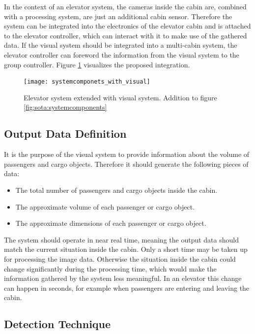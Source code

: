 In the context of an elevator system, 
the cameras inside the cabin are, 
combined with a processing system, 
are just an additional cabin sensor.
Therefore the system can be integrated into the electronics of the elevator cabin
and is attached to the elevator controller, 
which can interact with it to make use of the gathered data.
If the visual system should be integrated into a multi-cabin system, 
the elevator controller can foreword the information from the visual system to the group controller.
Figure \ref{fig:design:systemintegration} visualizes the proposed integration.

\begin{figure}[htb]
    \centering
    \texttt{[image: systemcomponets\_with\_visual]}
    \caption[Elevator system extended with visual system]{Elevator system extended with visual system. Addition to figure \ref{fig:sota:systemcomponents}}
    \label{fig:design:systemintegration}
\end{figure}

\subsection{Output Data Definition}

It is the purpose of the visual system to provide information about the volume of passengers and cargo objects.
Therefore it should generate the following pieces of data: 

\begin{itemize}
    \item The total number of passengers and cargo objects inside the cabin.
    \item The approximate volume of each passenger or cargo object.
    \item The approximate dimensions of each passenger or cargo object.
\end{itemize}

The system should operate in near real time,
meaning the output data should match the current situation inside the cabin.
Only a short time may be taken up for processing the image data.
Otherwise the situation inside the cabin could change significantly during the processing time, which would make the information gathered by the system less meaningful.
In an elevator this change can happen in seconds, for example when passengers are entering and leaving the cabin.

\subsection{Detection Technique}

